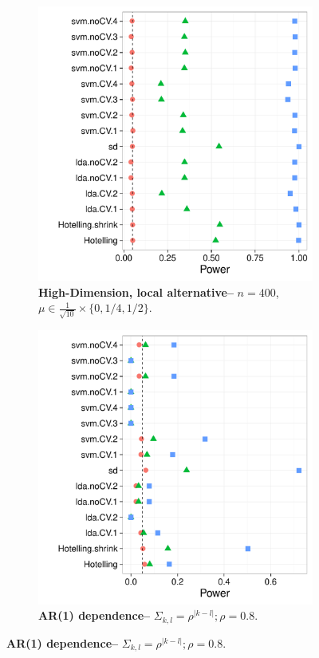 \documentclass[12pt,a4paper]{article}
\theoremstyle{definition}
\newcommand{\set}[1]{\{ #1 \}} %
\newcommand{\mycaption}{Simulation details in Appendix~\ref{apx:simulation_details} except the changes in the sub-captions.}
\begin{document}
\begin{figure}[h]
\centering
\caption{\mycaption}	
	\begin{subfigure}{.4\textwidth}
	  \centering
	  \includegraphics[width=1\linewidth]{"art/2016-08-11 08:32:39"}
	  \caption{\textbf{High-Dimension, local alternative--} $n=400$, $\mu \in \frac{1}{\sqrt{10}} \times \set{0,1/4,1/2}.$} 
	\label{fig:large_sample_3}
	\end{subfigure}
		\begin{subfigure}{.4\textwidth}
		  \centering
		  \includegraphics[width=1\linewidth]{"art/2016-08-07 20:11:46"}
		  \caption{\textbf{AR(1) dependence--} $\Sigma_{k,l}=\rho^{|k-l|}; \rho=0.8$. } 
		\label{fig:ar_1}
	\end{subfigure}
\end{figure}
\end{document}
